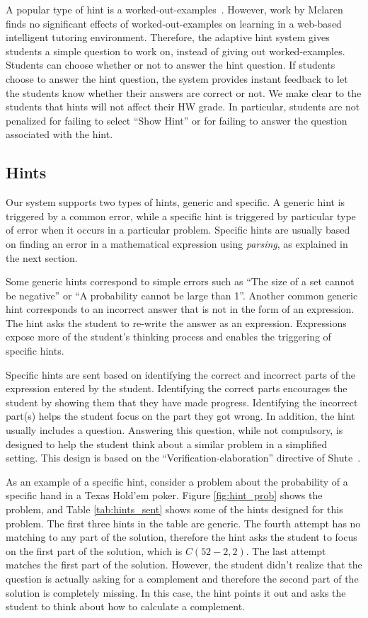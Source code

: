 \documentclass{llncs2e/llncs}
\begin{document}
A popular type of hint is a
worked-out-examples~\cite{Atkinson2000}. However, work by
Mclaren~\cite{McLaren2006} finds no significant effects of
worked-out-examples on learning in a web-based intelligent tutoring
environment. Therefore, the adaptive hint system gives students a
simple question to work on, instead of giving out
worked-examples. Students can choose whether or not to answer the hint
question. If students choose to answer the hint question, the system
provides instant feedback to let the students know whether their
answers are correct or not. We make clear to the students that hints
will not affect their HW grade. In particular, students are not
penalized for failing to select ``Show Hint'' or for failing to answer
the question associated with the hint.

\subsection*{Hints}

Our system supports two types of hints, generic and specific. A
generic hint is triggered by a common error, while a specific hint is
triggered by particular type of error when it occurs in a particular
problem. Specific hints are usually based on finding an error in a
mathematical expression using {\em parsing}, as explained in the next section.

Some generic hints correspond to simple errors such as ``The size of a
set cannot be negative'' or ``A probability cannot be large than
1''. Another common generic hint corresponds to an incorrect answer
that is not in the form of an expression. The hint asks the student to
re-write the answer as an expression.  Expressions expose more of the
student's thinking process and enables the triggering of specific hints.

Specific hints are sent based on identifying the correct and incorrect
parts of the expression entered by the student. Identifying the
correct parts encourages the student by showing them that they have
made progress. Identifying the incorrect part(s) helps the student
focus on the part they got wrong. In addition, the hint usually
includes a question. Answering this question, while not compulsory, is
designed to help the student think about a similar problem in a
simplified setting. This design is based on the
``Verification-elaboration'' directive of Shute~\cite{Shute2008}.

As an example of a specific hint, consider a problem about the
probability of a specific hand in a Texas Hold'em poker. Figure
\ref{fig:hint_prob} shows the problem, and Table \ref{tab:hints_sent}
shows some of the hints designed for this problem. The first three hints
in the table are generic. The fourth attempt has no matching to
any part of the solution, therefore the hint asks the student to focus
on the first part of the solution, which is $C(52-2,2)$. The last
attempt matches the first part of the solution. However, the student
didn't realize that the question is actually asking for a complement
and therefore the second part of the solution is completely
missing. In this case, the hint points it out and asks the student to
think about how to calculate a complement.
\end{document}
